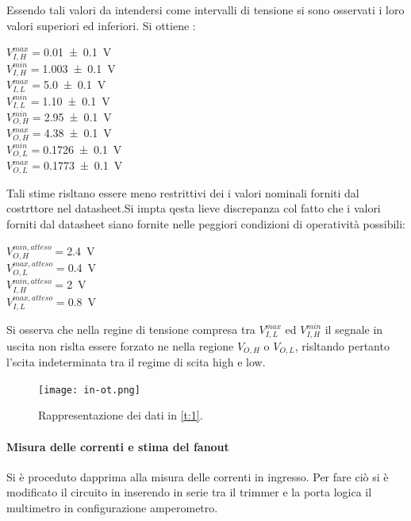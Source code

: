 	 Essendo tali valori da intendersi come intervalli di tensione si sono osservati i loro valori superiori ed inferiori.
	 Si ottiene :
	 \begin{center}
	 $V_{I,H}^{max}=$\SI{0.01 \pm 0.1}{\volt} \\
	 $V_{I,H}^{min}=$\SI{1.003 \pm 0.1}{\volt}\\
	 $V_{I,L}^{max}=$\SI{5.0 \pm 0.1}{\volt}\\
	 $V_{I,L}^{min}=$\SI{1.10 \pm 0.1}{\volt}\\

	 $V_{O,H}^{min}=$\SI{2.95 \pm 0.1}{\volt}\\
	 $V_{O,H}^{max}=$\SI{4.38 \pm 0.1}{\volt}\\
	 $V_{O,L}^{min}=$\SI{0.1726 \pm 0.1}{\volt}\\
	 $V_{O,L}^{max}=$\SI{0.1773 \pm 0.1}{\volt}	\\
	 \end{center}

	 Tali stime risltano essere meno restrittivi dei i valori
	 nominali forniti dal costrttore nel datasheet.Si impta qesta lieve discrepanza
	 col fatto che i valori forniti dal datasheet siano fornite nelle peggiori condizioni di operatività possibili:
	 \begin{center}

	 	$V_{O,H}^{min,atteso}=$\SI{2.4}{\volt}\\
	 	$V_{O,L}^{max,atteso}=$\SI{0.4}{\volt}\\
	 $V_{I,H}^{min,atteso}=$\SI{2}{\volt}\\
	 $V_{I,L}^{max,atteso}=$\SI{0.8}{\volt}\\
 \end{center}
	 Si osserva che nella regine di tensione compresa tra 	$V_{I,L}^{max}$ ed $V_{I,H}^{min}$ il segnale in uscita non rislta essere forzato ne nella regione $V_{O,H}$ o $V_{O,L}$, risltando pertanto  l'scita indeterminata tra il regime di scita high e low.
	\begin{figure}[h]
		\centering
		\texttt{[image: in-ot.png]}
		\caption{Rappresentazione dei dati in \tablename{ \ref{t:1}}.}
		\label{f:i1}
	\end{figure}


\paragraph{Misura delle correnti e stima del fanout}
	Si è proceduto dapprima alla misura delle correnti in ingresso.
	Per fare ciò si è modificato il circuito in  inserendo in serie tra il trimmer e la porta logica il multimetro in configurazione amperometro.

